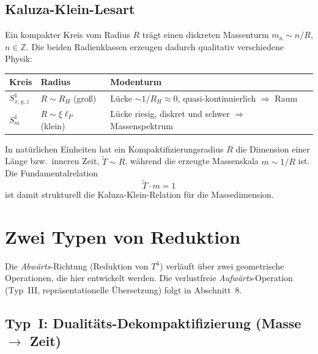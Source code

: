 \subsection{Kaluza-Klein-Lesart}

Ein kompakter Kreis vom Radius $R$ tr\"agt einen diskreten Massenturm
$m_n \sim n/R$, $n \in \mathbb{Z}$. Die beiden Radienklassen erzeugen dadurch
qualitativ verschiedene Physik:

\begin{center}
\begin{tabular}{lll}
\hline
\textbf{Kreis} & \textbf{Radius} & \textbf{Modenturm} \\
\hline
$S^1_{x,y,z}$ & $R\sim R_H$ (gro\ss) & L\"ucke $\sim 1/R_H \approx 0$, quasi-kontinuierlich $\Rightarrow$ Raum \\
$S^1_m$ & $R\sim \xi\ell_P$ (klein) & L\"ucke riesig, diskret und schwer $\Rightarrow$ Massenspektrum \\
\hline
\end{tabular}
\end{center}

\begin{proposition}[$\tilde T m = 1$ als Kompaktifizierungsrelation]\label{prop:tm}
In nat\"urlichen Einheiten hat ein Kompaktifizierungsradius $R$ die Dimension
einer L\"ange bzw.\ inneren Zeit, $\tilde{T}\sim R$, w\"ahrend die erzeugte
Massenskala $m \sim 1/R$ ist. Die Fundamentalrelation
\[
  \boxed{\;\tilde{T}\cdot m = 1\;}
\]
ist damit strukturell die Kaluza-Klein-Relation f\"ur die Massedimension.
\end{proposition}

\section{Zwei Typen von Reduktion}

Die \emph{Abw\"arts}-Richtung (Reduktion von $T^4$) verl\"auft \"uber zwei
geometrische Operationen, die hier entwickelt werden. Die verlustfreie
\emph{Aufw\"arts}-Operation (Typ~III, repr\"asentationelle \"Ubersetzung) folgt
in Abschnitt~8.

\subsection{Typ~I: Dualit\"ats-Dekompaktifizierung (Masse $\to$ Zeit)}

